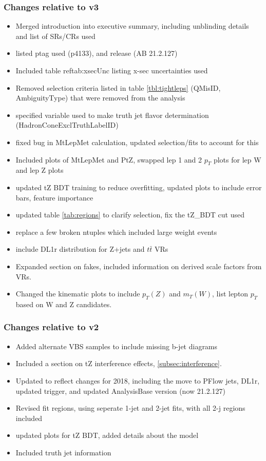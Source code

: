 \documentclass[NOTE, atlasdraft=true, texlive=2016, UKenglish]{\ATLASLATEXPATH atlasdoc}
\begin{document}
\subsubsection{Changes relative to v3}
\begin{itemize}
  \item Merged introduction into executive summary, including unblinding details and list of SRs/CRs used
  \item listed ptag used (p4133), and release (AB 21.2.127)
  \item Included table ref{tab:xsecUnc} listing x-sec uncertainties used
  \item Removed selection criteria listed in table \ref{tbl:tightleps} (QMisID, AmbiguityType) that were removed from the analysis
  \item specified variable used to make truth jet flavor determination (HadronConeExclTruthLabelID)
  \item fixed bug in MtLepMet calculation, updated selection/fits to account for this
  \item Included plots of MtLepMet and PtZ, swapped lep 1 and 2 $p_T$ plots for lep W and lep Z plots
  \item updated tZ BDT training to reduce overfitting, updated plots to include error bars, feature importance
  \item updated table \ref{tab:regions} to clarify selection, fix the tZ\_BDT cut used
  \item replace a few broken ntuples which included large weight events
  \item include DL1r distribution for Z+jets and $t\bar{t}$ VRs
  \item Expanded section on fakes, included information on derived scale factors from VRs.
  \item Changed the kinematic plots to include $p_T(Z)$ and $m_T(W)$, list lepton $p_T$ based on W and Z candidates.
\end{itemize}

\subsubsection{Changes relative to v2}

\begin{itemize}
    \item Added alternate VBS samples to include missing b-jet diagrams
    \item Included a section on tZ interference effects, \ref{subsec:interference}. 
    \item Updated to reflect changes for 2018, including the move to PFlow jets, DL1r, updated trigger, and updated AnalysisBase version (now 21.2.127)
    \item Revised fit regions, using seperate 1-jet and 2-jet fits, with all 2-j regions included
    \item updated plots for tZ BDT, added details about the model
    \item Included truth jet information
\end{itemize}
\end{document}
